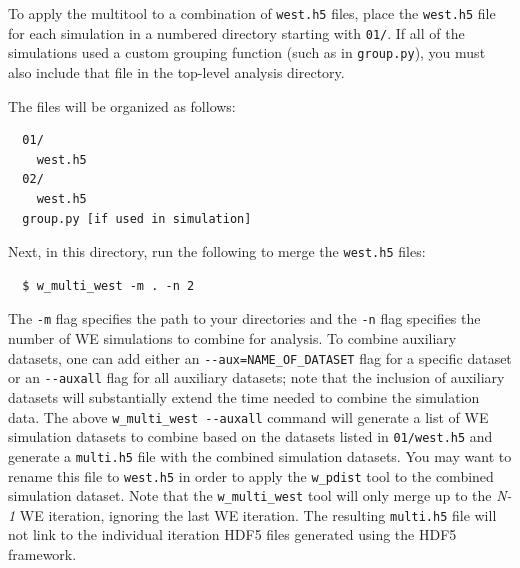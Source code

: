 To apply the multitool to a combination of \verb|west.h5| files, place the \verb|west.h5| file for each simulation in a numbered directory starting with \verb|01/|. 
If all of the simulations used a custom grouping function (such as in \verb|group.py|), you must also include that file in the top-level analysis directory. 

The files will be organized as follows:
\begin{verbatim}
  01/
    west.h5
  02/
    west.h5
  group.py [if used in simulation]
\end{verbatim}

Next, in this directory, run the following to merge the \verb|west.h5| files:
\begin{verbatim}
  $ w_multi_west -m . -n 2
\end{verbatim}

The \verb|-m| flag specifies the path to your directories and the \verb|-n| flag specifies the number of WE simulations to combine for analysis. 
To combine auxiliary datasets, one can add either an \verb|--aux=NAME_OF_DATASET| flag for a specific dataset or an \verb|--auxall| flag for all auxiliary datasets; note that the inclusion of auxiliary datasets will substantially extend the time needed to combine the simulation data. 
The above \verb|w_multi_west --auxall| command will generate a list of WE simulation datasets to combine based on the datasets listed in \verb|01/west.h5| and generate a \verb|multi.h5| file with the combined simulation datasets. 
You may want to rename this file to \verb|west.h5| in order to apply the \verb|w_pdist| tool to the combined simulation dataset. 
Note that the \verb|w_multi_west| tool will only merge up to the \textit{N-1} WE iteration, ignoring the last WE iteration. 
The resulting \verb|multi.h5| file will not link to the individual iteration HDF5 files generated using the HDF5 framework.

